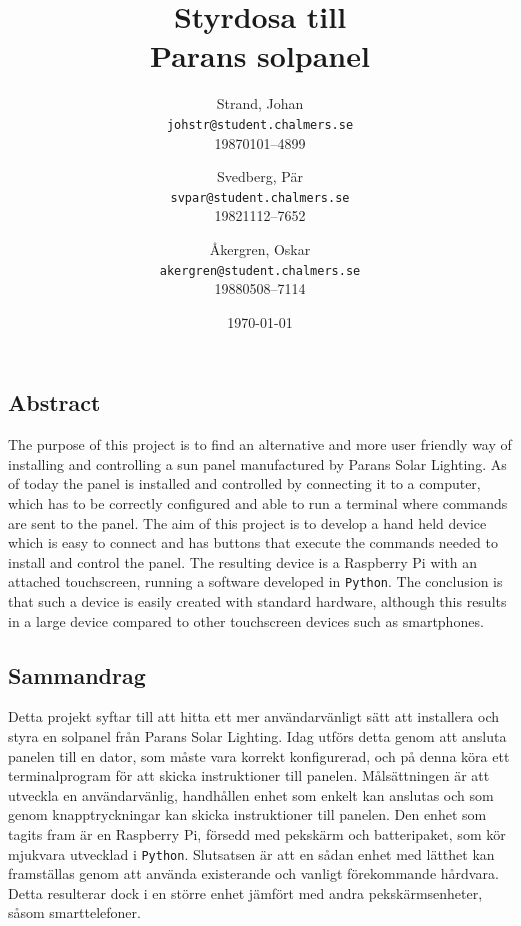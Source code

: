 \documentclass{article}
\author{    Strand, Johan \\ \texttt{johstr@student.chalmers.se} \\ 
            19870101--4899 \and
            Svedberg, Pär\\ \texttt{svpar@student.chalmers.se}  \\ 
            19821112--7652 \and
            Åkergren, Oskar\\ \texttt{akergren@student.chalmers.se}  \\ 19880508--7114
}
\title{\vspace{2cm} Styrdosa till \\ Parans solpanel  \vspace{1cm}}
\date{\vspace{8cm}\today}
\begin{document}
    \maketitle
    \thispagestyle{empty}

    \newpage 
    
    \setcounter{page}{1}

    \subsection*{Abstract} %
    \label{sub:abstract}
            The purpose of this project is to find an alternative and more 
            user friendly way of installing and controlling a sun panel 
            manufactured by Parans Solar Lighting. As of today the panel is 
            installed and controlled by connecting it to a computer, 
            which has to be correctly configured and able to run a terminal 
            where commands are sent to the panel. The aim of this project is 
            to develop a hand held device which is easy to connect and has 
            buttons that execute the commands needed to install and control 
            the panel. The resulting device is a Raspberry Pi with an attached
            touchscreen, running a software developed in \texttt{Python}.  
            The conclusion is that such a device is easily created with standard
            hardware, although this results in a large device 
            compared to other touchscreen devices such as smartphones.
            
    \subsection*{Sammandrag} %
    \label{sub:sammandrag}
            Detta projekt syftar till att hitta ett mer användarvänligt sätt 
            att installera och styra en solpanel från Parans Solar Lighting. 
            Idag utförs detta genom att ansluta panelen till en dator, som 
            måste vara korrekt konfigurerad, och på denna köra ett 
            terminalprogram för att skicka instruktioner till panelen. 
            Målsättningen är att utveckla en            användarvänlig, handhållen enhet som enkelt kan anslutas och som
            genom knapptryckningar kan skicka instruktioner till panelen. Den
            enhet som tagits fram är en Raspberry Pi, försedd med pekskärm och
            batteripaket, som kör mjukvara utvecklad i \texttt{Python}.
            Slutsatsen är att en sådan enhet med lätthet kan framställas genom
            att använda existerande och vanligt förekommande hårdvara. Detta
            resulterar dock i en större enhet jämfört med andra
            pekskärmsenheter, såsom smarttelefoner.
\end{document}

